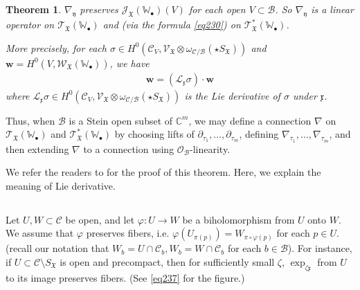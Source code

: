 \documentclass[11pt,b5paper,notitlepage]{article}
\theoremstyle{definition}
\theoremstyle{plain}
\newtheorem{thm}[df]{Theorem}
\newcommand{\fk}{\mathfrak}
\newcommand{\mc}{\mathcal}
\newcommand{\scr}{\mathscr}
\newcommand{\xk}{\mathfrak x}
\newcommand{\yk}{\mathfrak y}
\newcommand{\SX}{{S_{\fk X}}}
\newcommand{\blt}{\bullet}
\newcommand{\Wbb}{\mathbb W}
\newcommand{\Cbb}{\mathbb C}
\newcommand{\wbf}{\mathbf w}
\numberwithin{equation}{section}
\begin{document}
\subsection{}


\begin{thm}\label{lb132}
$\nabla_\yk$ preserves $\scr J_{\fk X}(\Wbb_\blt)(V)$ for each open $V\subset\mc B$. So $\nabla_\yk$ is a linear operator on $\scr T_{\fk X}(\Wbb_\blt)$ and (via the formula \eqref{eq230}) on $\scr T^*_{\fk X}(\Wbb_\blt)$.

More precisely, for each $\sigma\in H^0(\mc C_V,\scr V_{\fk X}\otimes\omega_{\mc C/\mc B}(\star\SX))$ and $\wbf=H^0(V,\scr W_{\fk X}(\Wbb_\blt))$, we have
\begin{align}
[\nabla_\yk,\sigma]\wbf=(\mc L_\xk \sigma)\cdot\wbf
\end{align}
where $\mc L_\xk\sigma\in H^0(\mc C_V,\scr V_{\fk X}\otimes\omega_{\mc C/\mc B}(\star\SX))$ is the Lie derivative of $\sigma$ under $\xk$.
\end{thm}

Thus, when $\mc B$ is a Stein open subset of $\Cbb^m$, we may define a connection $\nabla$ on $\scr T_{\fk X}(\Wbb_\blt)$ and $\scr T_{\fk X}^*(\Wbb_\blt)$ by choosing lifts of $\partial_{\tau_1},\dots,\partial_{\tau_m}$, defining $\nabla_{\tau_1},\dots,\nabla_{\tau_m}$, and then extending $\nabla$ to a connection using $\scr O_{\mc B}$-linearity.

We refer the readers to \cite[Sec. 3.6]{Gui} for the proof of this theorem. Here, we explain the meaning of Lie derivative. 

\subsection{}

Let $U,W\subset\mc C$ be open, and let $\varphi:U\rightarrow W$ be a biholomorphism from $U$ onto $W$. We assume that $\varphi$ preserves fibers, i.e. $\varphi(U_{\pi(p)})=W_{\pi\circ\varphi(p)}$ for each $p\in U$. (recall our notation that $W_b=U\cap\mc C_b,W_b=W\cap\mc C_b$ for each $b\in\mc B$). For instance, if $U\subset\mc C\setminus\SX$ is open and precompact, then for sufficiently small $\zeta$,  $\exp_{\zeta\xk}$ from $U$ to its image preserves fibers. (See \eqref{eq237} for the figure.)
\end{document}
